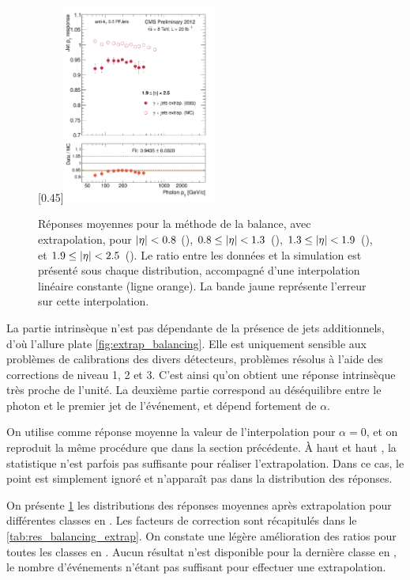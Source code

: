 \begin{figure}[p!]
    \subcaptionbox{\label{fig:bal_extrap_eta1925}}[0.45\textwidth]{\includegraphics[width=0.45\textwidth]{chapitre4/figs/resp_balancing_extrap/response_eta1925_balancing_extrap.pdf}}
    \caption{Réponses moyennes pour la méthode de la balance, avec extrapolation, pour $\lvert \eta \rvert < \num{0.8}$ (), $\num{0.8} \leq \lvert \eta \rvert < \num{1.3}$ (), $\num{1.3} \leq \lvert \eta \rvert < \num{1.9}$ (), et $\num{1.9} \leq \lvert \eta \rvert < \num{2.5}$ (). Le ratio entre les données et la simulation est présenté sous chaque distribution, accompagné d'une interpolation linéaire constante (ligne orange). La bande jaune représente l'erreur sur cette interpolation.}
    \label{fig:balancing_extrap_resp}
\end{figure}


La partie intrinsèque n'est pas dépendante de la présence de jets additionnels, d'où l'allure plate \cref{fig:extrap_balancing}. Elle est uniquement sensible aux problèmes de calibrations des divers détecteurs, problèmes résolus à l'aide des corrections de niveau 1, 2 et 3. C'est ainsi qu'on obtient une réponse intrinsèque très proche de l'unité. La deuxième partie correspond au déséquilibre entre le photon et le premier jet de l'événement, et dépend fortement de $\alpha$.

On utilise comme réponse moyenne la valeur de l'interpolation pour $\alpha = 0$, et on reproduit la même procédure que dans la section précédente. À haut \pt et haut \aeta, la statistique n'est parfois pas suffisante pour réaliser l'extrapolation. Dans ce cas, le point est simplement ignoré et n'apparaît pas dans la distribution des réponses.

On présente \cref{fig:balancing_extrap_resp} les distributions des réponses moyennes après extrapolation pour différentes classes en \aeta. Les facteurs de correction sont récapitulés dans le \cref{tab:res_balancing_extrap}. On constate une légère amélioration des ratios pour toutes les classes en \aeta. Aucun résultat n'est disponible pour la dernière classe en \aeta, le nombre d'événements n'étant pas suffisant pour effectuer une extrapolation.

